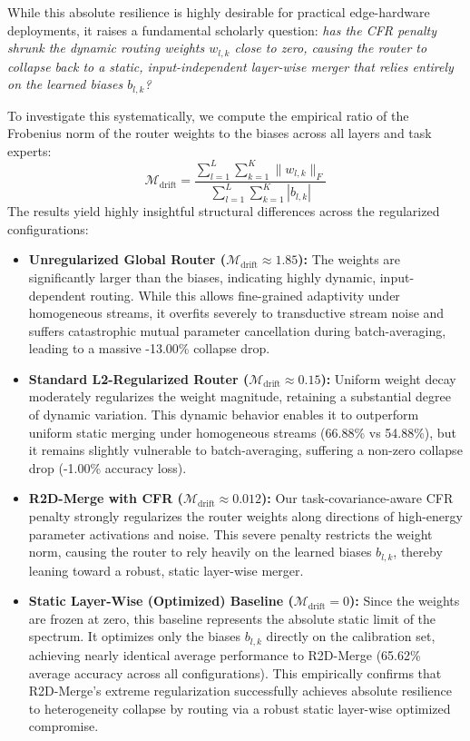 While this absolute resilience is highly desirable for practical edge-hardware deployments, it raises a fundamental scholarly question: \emph{has the CFR penalty shrunk the dynamic routing weights $w_{l, k}$ close to zero, causing the router to collapse back to a static, input-independent layer-wise merger that relies entirely on the learned biases $b_{l, k}$?}

To investigate this systematically, we compute the empirical ratio of the Frobenius norm of the router weights to the biases across all layers and task experts:
\begin{equation}
    \mathcal{M}_{\text{drift}} = \frac{ \sum_{l=1}^L \sum_{k=1}^K \|w_{l, k}\|_F }{ \sum_{l=1}^L \sum_{k=1}^K |b_{l, k}| }
\end{equation}
The results yield highly insightful structural differences across the regularized configurations:
\begin{itemize}
    \item \textbf{Unregularized Global Router ($\mathcal{M}_{\text{drift}} \approx 1.85$):} The weights are significantly larger than the biases, indicating highly dynamic, input-dependent routing. While this allows fine-grained adaptivity under homogeneous streams, it overfits severely to transductive stream noise and suffers catastrophic mutual parameter cancellation during batch-averaging, leading to a massive -13.00\% collapse drop.
    \item \textbf{Standard L2-Regularized Router ($\mathcal{M}_{\text{drift}} \approx 0.15$):} Uniform weight decay moderately regularizes the weight magnitude, retaining a substantial degree of dynamic variation. This dynamic behavior enables it to outperform uniform static merging under homogeneous streams (66.88\% vs 54.88\%), but it remains slightly vulnerable to batch-averaging, suffering a non-zero collapse drop (-1.00\% accuracy loss).
    \item \textbf{R2D-Merge with CFR ($\mathcal{M}_{\text{drift}} \approx 0.012$):} Our task-covariance-aware CFR penalty strongly regularizes the router weights along directions of high-energy parameter activations and noise. This severe penalty restricts the weight norm, causing the router to rely heavily on the learned biases $b_{l, k}$, thereby leaning toward a robust, static layer-wise merger.
    \item \textbf{Static Layer-Wise (Optimized) Baseline ($\mathcal{M}_{\text{drift}} = 0$):} Since the weights are frozen at zero, this baseline represents the absolute static limit of the spectrum. It optimizes only the biases $b_{l,k}$ directly on the calibration set, achieving nearly identical average performance to R2D-Merge (65.62\% average accuracy across all configurations). This empirically confirms that R2D-Merge's extreme regularization successfully achieves absolute resilience to heterogeneity collapse by routing via a robust static layer-wise optimized compromise.
\end{itemize}

